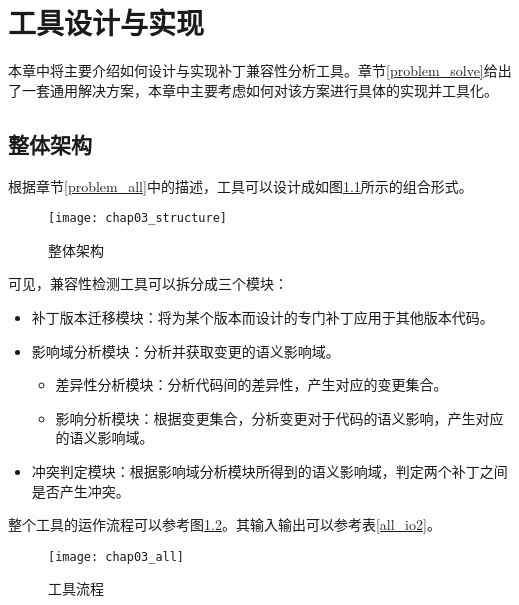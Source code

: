 \chapter{工具设计与实现}
本章中将主要介绍如何设计与实现补丁兼容性分析工具。章节\ref {problem_solve}给出了一套通用解决方案，本章中主要考虑如何对该方案进行具体的实现并工具化。

\section{整体架构}
\label {tool_struct}

根据章节\ref {problem_all}中的描述，工具可以设计成如图\ref {structure}所示的组合形式。

\begin{figure}[H]
	\centering
	\texttt{[image: chap03\_structure]}
	\caption {整体架构}	
	\label {structure}
\end{figure}

可见，兼容性检测工具可以拆分成三个模块：
\begin{itemize}
	\item 补丁版本迁移模块：将为某个版本而设计的专门补丁应用于其他版本代码。
	\item 影响域分析模块：分析并获取变更的语义影响域。
	\begin{itemize}
		\item 差异性分析模块：分析代码间的差异性，产生对应的变更集合。
		\item 影响分析模块：根据变更集合，分析变更对于代码的语义影响，产生对应的语义影响域。
	\end{itemize}
	\item 冲突判定模块：根据影响域分析模块所得到的语义影响域，判定两个补丁之间是否产生冲突。
\end{itemize}

整个工具的运作流程可以参考图\ref {solution_all}。其输入输出可以参考表\ref {all_io2}。

\begin{figure}[H]
	\centering
	\texttt{[image: chap03\_all]}
	\caption {工具流程}
	\label {solution_all}	
\end{figure}

